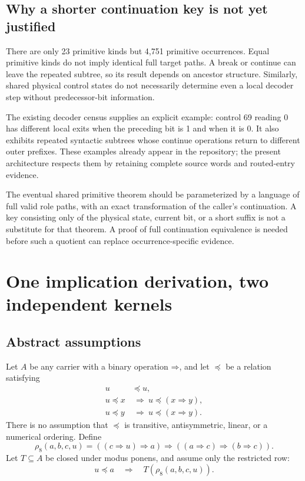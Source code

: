 \documentclass[11pt,letterpaper]{article}
\theoremstyle{definition}\newtheorem{definition}[theorem]{Definition}
\theoremstyle{remark}\newtheorem{remark}[theorem]{Remark}
\newcommand{\Rho}{\rho_8}
\newcommand{\imp}{\mathbin{\Rightarrow}}
\begin{document}
\subsection{Why a shorter continuation key is not yet justified}

There are only 23 primitive kinds but 4,751 primitive occurrences. Equal primitive kinds do not imply identical full target paths. A break or continue can leave the repeated subtree, so its result depends on ancestor structure. Similarly, shared physical control states do not necessarily determine even a local decoder step without predecessor-bit information.

The existing decoder census supplies an explicit example: control 69 reading 0 has different local exits when the preceding bit is 1 and when it is 0. It also exhibits repeated syntactic subtrees whose continue operations return to different outer prefixes. These examples already appear in the repository; the present architecture respects them by retaining complete source words and routed-entry evidence.\cite{decodercensus}

The eventual shared primitive theorem should be parameterized by a language of full valid role paths, with an exact transformation of the caller's continuation. A key consisting only of the physical state, current bit, or a short suffix is not a substitute for that theorem. A proof of full continuation equivalence is needed before such a quotient can replace occurrence-specific evidence.

\section{One implication derivation, two independent kernels}

\subsection{Abstract assumptions}

Let $A$ be any carrier with a binary operation $\imp$, and let $\preceq$ be a relation satisfying
\begin{align}
u&\preceq u,\label{eq:refl}\\
u\preceq x&\ \Longrightarrow\ u\preceq (x\imp y),\label{eq:growleft}\\
u\preceq y&\ \Longrightarrow\ u\preceq (x\imp y).\label{eq:growright}
\end{align}
There is no assumption that $\preceq$ is transitive, antisymmetric, linear, or a numerical ordering. Define
\[
\Rho(a,b,c,u)=((c\imp u)\imp a)\imp((a\imp c)\imp(b\imp c)).
\]
Let $T\subseteq A$ be closed under modus ponens, and assume only the restricted row:
\[
u\preceq a\quad\Longrightarrow\quad T(\Rho(a,b,c,u)).
\]
\end{document}
